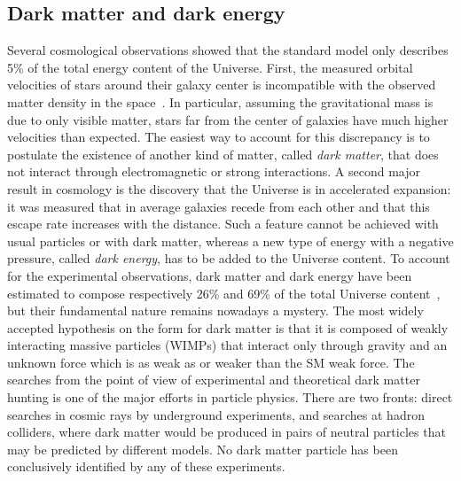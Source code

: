 \subsection*{Dark matter and dark energy}

Several cosmological observations showed that the standard model only describes 5\% of the total energy content of the Universe.
First, the measured orbital velocities of stars around their galaxy center is incompatible with the observed matter density in the space~\cite{DarkMatterRubin,Iocco:2015xga}.
In particular, assuming the gravitational mass is due to only visible matter, stars far from the center of galaxies have much higher velocities than expected. %
The easiest way to account for this discrepancy is to postulate the existence of another kind of matter, called \textit{dark matter}, that does not interact through electromagnetic or strong interactions.
A second major result in cosmology is the discovery that the Universe is in accelerated expansion: it was measured that in average galaxies recede from each other and that this escape rate increases with the distance.
Such a feature cannot be achieved with usual particles or with dark matter, whereas a new type of energy with a negative pressure, called \textit{dark energy}, has to be added to the Universe content.
To account for the experimental observations, dark matter and dark energy have been estimated to compose respectively 26\% and 69\% of the total Universe content~\cite{Ade:2015xua}, but their fundamental nature remains nowadays a mystery.
The most widely accepted hypothesis on the form for dark matter is that it is composed of weakly interacting massive particles (WIMPs) that interact only through gravity and an unknown force which is as weak as or weaker than the SM weak force.
The searches from the point of view of experimental and theoretical dark matter hunting is one of the major efforts in particle physics.
There are two fronts: direct searches in cosmic rays by underground experiments, and searches at hadron colliders, where dark matter would be produced in pairs of neutral particles that may be predicted by different models.
No dark matter particle has been conclusively identified by any of these experiments.

